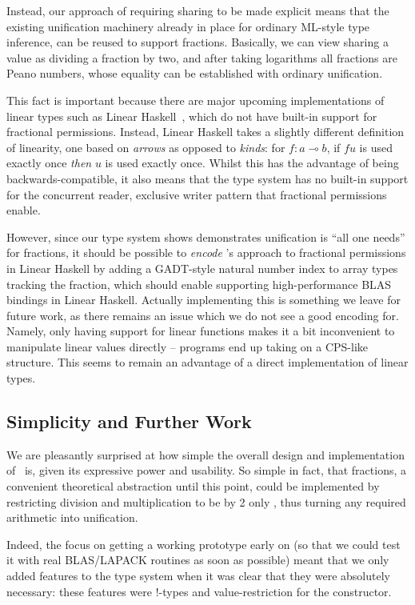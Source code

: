 Instead, our approach of requiring sharing to be made explicit means
that the existing unification machinery already in place for ordinary
ML-style type inference, can be reused to support fractions. Basically,
we can view sharing a value as dividing a fraction by two, and after
taking logarithms all fractions are Peano numbers, whose equality can
be established with ordinary unification. 

This fact is important because there are major upcoming
implementations of linear types such as Linear
Haskell~\cite{bernardy2017linear}, which do not have built-in support
for fractional permissions. Instead, Linear Haskell takes a slightly
different definition of linearity, one based on \emph{arrows} as
opposed to \emph{kinds}: for $f : a \multimap b$, if $f u$ is used
exactly once \emph{then} $u$ is used exactly once. Whilst this has the
advantage of being backwards-compatible, it also means that the type
system has no built-in support for the concurrent reader, exclusive
writer pattern that fractional permissions enable.

However, since our type system shows demonstrates unification is ``all
one needs'' for fractions, it should be possible to \emph{encode}
\lang's approach to fractional permissions in Linear Haskell by adding
a GADT-style natural number index to array types tracking the
fraction, which should enable supporting high-performance BLAS
bindings in Linear Haskell. Actually implementing this is something we
leave for future work, as there remains an issue which we do not see a
good encoding for. Namely, only having support for linear functions
makes it a bit inconvenient to manipulate linear values directly --
programs end up taking on a CPS-like structure. This seems to remain
an advantage of a direct implementation of linear types. 


\subsection{Simplicity and Further Work}

We are pleasantly surprised at how simple the overall design and implementation
of \lang\ is, given its expressive power and usability.  So simple in fact,
that fractions, a convenient theoretical abstraction until this point, could be
implemented by restricting division and multiplication to be by 2 only
\cite{boyland2003}, thus turning any required arithmetic into unification.

Indeed, the focus on getting a working prototype early on (so that we could
test it with real BLAS/LAPACK routines as soon as possible) meant that we only
added features to the type system when it was clear that they were absolutely
necessary: these features were !-types and value-restriction for the
 constructor. 

